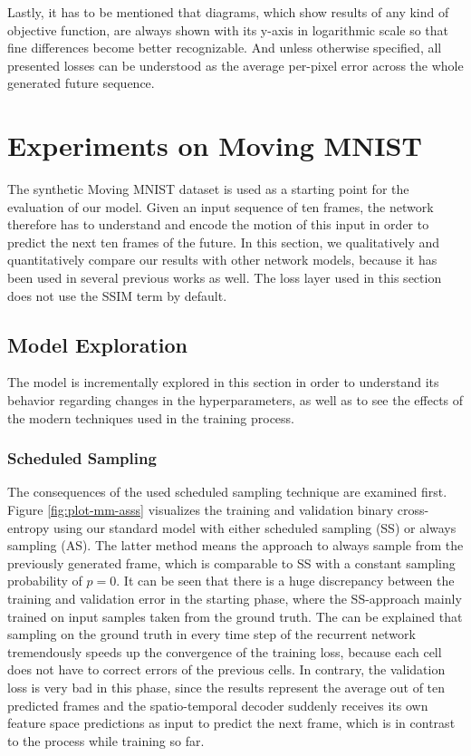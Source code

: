 Lastly, it has to be mentioned that diagrams, which show results of any kind of objective function, are always shown with its y-axis in logarithmic scale so that fine differences become better recognizable. And unless otherwise specified, all presented losses can be understood as the average per-pixel error across the whole generated future sequence.

\section{Experiments on Moving MNIST} \label{sec:exp-mm}

The synthetic Moving MNIST dataset is used as a starting point for the evaluation of our model. Given an input sequence of ten frames, the network therefore has to understand and encode the motion of this input in order to predict the next ten frames of the future. In this section, we qualitatively and quantitatively compare our results with other network models, because it has been used in several previous works as well. The loss layer used in this section does not use the SSIM term by default.

\subsection{Model Exploration}

The model is incrementally explored in this section in order to understand its behavior regarding changes in the hyperparameters, as well as to see the effects of the modern techniques used in the training process.

\subsubsection*{Scheduled Sampling}

The consequences of the used scheduled sampling technique are examined first. Figure \ref{fig:plot-mm-asss} visualizes the training and validation binary cross-entropy using our standard model with either scheduled sampling (SS) or always sampling (AS). The latter method means the approach to always sample from the previously generated frame, which is comparable to SS with a constant sampling probability of $p=0$. It can be seen that there is a huge discrepancy between the training and validation error in the starting phase, where the SS-approach mainly trained on input samples taken from the ground truth. The can be explained that sampling on the ground truth in every time step of the recurrent network tremendously speeds up the convergence of the training loss, because each cell does not have to correct errors of the previous cells. In contrary, the validation loss is very bad in this phase, since the results represent the average out of ten predicted frames and the spatio-temporal decoder suddenly receives its own feature space predictions as input to predict the next frame, which is in contrast to the process while training so far.

